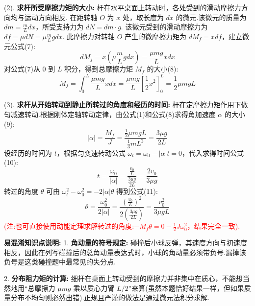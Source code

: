 (2). \textbf{求杆所受摩擦力矩的大小:}
杆在水平桌面上转动时，各处受到的滑动摩擦力方向均与运动方向相反.
在距转轴 $O$ 为 $x$ 处，取长度为 $dx$ 的微元.该微元的质量为 $dm = \frac{m}{L} dx$，所受支持力为 $dN = dm \cdot g$.
该微元受到的滑动摩擦力为 $df = \mu dN = \mu \frac{m}{L} g dx$.
此摩擦力对转轴 $O$ 产生的微摩擦力矩为 $dM_f = x df$，建立微元公式(7):
\begin{equation}
	dM_f = x \left(\mu \frac{m}{L} g dx\right) = \frac{\mu m g}{L} x dx
\end{equation}
对公式(7)从 $0$ 到 $L$ 积分，得到总摩擦力矩 $M_f$ 的大小(8):
\begin{equation}
	M_f = \int_{0}^{L} \frac{\mu m g}{L} x dx = \frac{\mu m g}{L} \left[ \frac{1}{2}x^2 \right]_{0}^{L} = \frac{1}{2} \mu m g L
\end{equation}

(3). \textbf{求杆从开始转动到静止所转过的角度和经历的时间:}
杆在定摩擦力矩作用下做匀减速转动.根据刚体定轴转动定律，由公式(1)和公式(8)求得角加速度 $\alpha$ 的大小(9):
\begin{equation}
	|\alpha| = \frac{M_f}{J} = \frac{\frac{1}{2} \mu m g L}{\frac{1}{3}mL^2} = \frac{3 \mu g}{2 L}
\end{equation}
设经历的时间为 $t$，根据匀变速转动公式 $\omega_t = \omega_0 - |\alpha| t = 0$，代入求得时间公式(10):
\begin{equation}
	t = \frac{\omega_0}{|\alpha|} = \frac{\frac{v_0}{L}}{\frac{3 \mu g}{2 L}} = \frac{2v_0}{3\mu g}
\end{equation}
转过的角度 $\theta$ 可由 $\omega_t^2 - \omega_0^2 = -2|\alpha|\theta$ 得到公式(11):
\begin{equation}
	\theta = \frac{\omega_0^2}{2|\alpha|} = \frac{\left(\frac{v_0}{L}\right)^2}{2 \left(\frac{3 \mu g}{2 L}\right)} = \frac{v_0^2}{3 \mu g L}
\end{equation}
\textcolor{red}{(注:也可直接使用动能定理求解转过的角度:$-M_f \theta = 0 - \frac{1}{2}J\omega_0^2$，结果完全一致).}

\vspace{1em}

\textbf{易混淆知识点说明:}
1. \textbf{角动量的符号规定:} 碰撞后小球反弹，其速度方向与初速度相反，因此在列写碰撞后的总角动量表达式时，小球的角动量必须带负号.漏掉该负号是这类碰撞题中最常见的失分点.

2. \textbf{分布阻力矩的计算:} 细杆在桌面上转动受到的摩擦力并非集中在质心，不能想当然地用“总摩擦力 $\mu mg$ 乘以质心力臂 $L/2$”来算(虽然本题恰好结果一样，但如果质量分布不均匀则必然出错).正规且严谨的做法是通过微元法积分求解.

